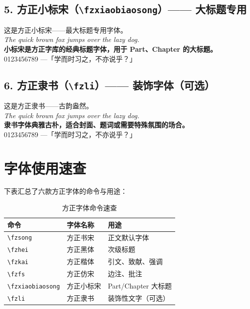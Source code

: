 {\medskip

\subsection*{5. 方正小标宋（\texttt{\textbackslash fzxiaobiaosong}）—— 大标题专用}
\fzxiaobiaosong
\Large 这是方正小标宋——{\LARGE 最大标题专用字体}。\\
\large \textit{The quick brown fox jumps over the lazy dog.}\\
\textbf{小标宋是方正字库的经典标题字体，用于 Part、Chapter 的大标题。}\\
\large 0123456789 —「学而时习之，不亦说乎？」

\medskip

\subsection*{6. 方正隶书（\texttt{\textbackslash fzli}）—— 装饰字体（可选）}
\fzli
\large 这是方正隶书——{\LARGE 古韵盎然}。\\
\large \textit{The quick brown fox jumps over the lazy dog.}\\
\textbf{隶书字体典雅古朴，适合封面、题词或需要特殊氛围的场合。}\\
\large 0123456789 —「学而时习之，不亦说乎？」

} %



\section{字体使用速查}

下表汇总了六款方正字体的命令与用途：

\begin{table}[h]
\centering
\caption{方正字体命令速查}
\begin{tabular}{@{}llp{6cm}@{}}
\toprule
命令 & 字体名称 & 用途 \\
\midrule
\lstinline|\fzsong| & 方正书宋 & 正文默认字体 \\
\lstinline|\fzhei|  & 方正黑体 & 次级标题 \\
\lstinline|\fzkai|  & 方正楷体 & 引文、致献、强调 \\
\lstinline|\fzfs|   & 方正仿宋 & 边注、批注 \\
\lstinline|\fzxiaobiaosong| & 方正小标宋 & Part/Chapter 大标题 \\
\lstinline|\fzli|   & 方正隶书 & 装饰性文字（可选） \\
\bottomrule
\end{tabular}
\end{table}

